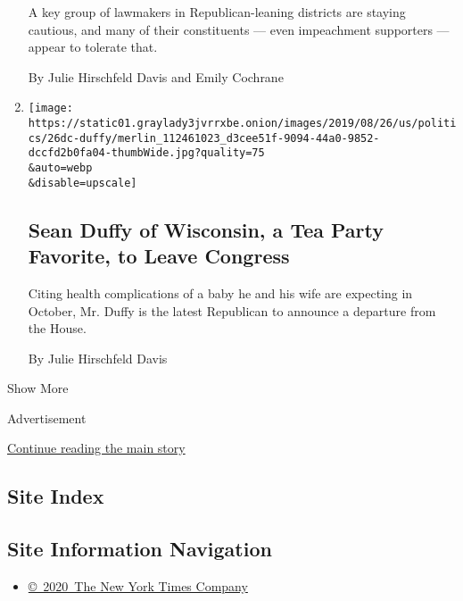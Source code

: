 \begin{enumerate}
  A key group of lawmakers in Republican-leaning districts are staying
  cautious, and many of their constituents --- even impeachment
  supporters --- appear to tolerate that.

  By Julie Hirschfeld Davis and Emily Cochrane
\item
  \href{/2019/08/26/us/politics/sean-duffy-resigns.html}{}

  \texttt{[image: https://static01.graylady3jvrrxbe.onion/images/2019/08/26/us/politics/26dc-duffy/merlin\_112461023\_d3cee51f-9094-44a0-9852-dccfd2b0fa04-thumbWide.jpg?quality=75\\\&auto=webp\\\&disable=upscale]}

  \hypertarget{sean-duffy-of-wisconsin-a-tea-party-favorite-to-leave-congress}{%
  \subsection{Sean Duffy of Wisconsin, a Tea Party Favorite, to Leave
  Congress}\label{sean-duffy-of-wisconsin-a-tea-party-favorite-to-leave-congress}}

  Citing health complications of a baby he and his wife are expecting in
  October, Mr. Duffy is the latest Republican to announce a departure
  from the House.

  By Julie Hirschfeld Davis
\end{enumerate}

Show More

Advertisement

\protect\hyperlink{after-mid2}{Continue reading the main story}

\hypertarget{site-index}{%
\subsection{Site Index}\label{site-index}}

\hypertarget{site-information-navigation}{%
\subsection{Site Information
Navigation}\label{site-information-navigation}}

\begin{itemize}
\tightlist
\item
  \href{https://help.nytimes3xbfgragh.onion/hc/en-us/articles/115014792127-Copyright-notice}{©~2020~The
  New York Times Company}
\end{itemize}

